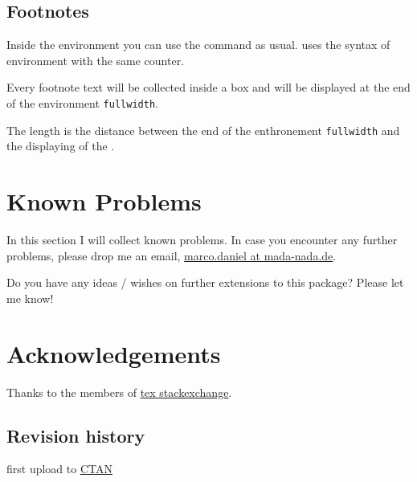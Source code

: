 \documentclass[parskip=false,english,11pt]{ltxmdf}
\def\fwdname{\texttt{fullwidth}\xspace}
\begin{document}
\subsection{Footnotes}
Inside the environment you can use the command  as usual. \mdname uses the syntax of environment  with the same counter.

Every footnote text will be collected inside a box and will be displayed at the end of the environment \fwdname. 

 The length is the distance between the end of the enthronement \fwdname and the displaying of the .

%


\section{Known Problems}
 In this section I will collect known problems. In case you encounter any further problems, please
 drop me an email, \href{mailto:marco.daniel@mada-nada.de}{marco.daniel at mada-nada.de}.

   Do you have any ideas / wishes on further extensions to this package? Please let me know!

\section{Acknowledgements}
Thanks to the members of \href{http://tex.stackexchange.com/}{tex stackexchange}.

\subsection{Revision history}\label{rev}
\raggedright
{}
\begin{itemize*}
\item first upload to \href{http://dante.ctan.org/upload}{CTAN}
\end{itemize*}
\end{document}
